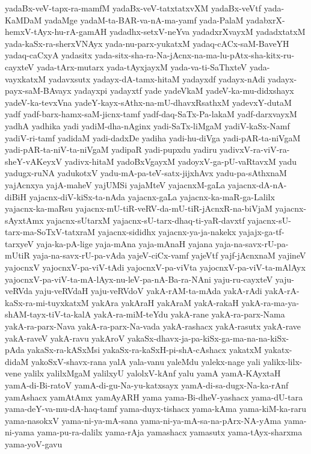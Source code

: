 {yadaBx-veV-tapx-ra-mamfM
yadaBx-veV-tatxtatxvXM
yadaBx-veVtf
yada-KaMDaM
yadaMge
yadaM-ta-BAR-va-nA-ma-yamf
yada-PalaM
yadabxrX-hemxV-tAyx-hu-rA-gamAH
yadadhx-setxV-neYva
yadadxrXvayxM
yadadxtatxM
yada-kaSx-ra-sherxVNAyx
yada-nu-parx-yukatxM
yadaq-cACx-saM-BaveYH
yadaq-caCxyA
yadasitx
yada-sitx-sha-ra-Na-jAcnx-na-ma-lu-pAtx-sha-kitx-ru-cayxteV
yada-tArx-mutarx
yada-tAyxjayxM
yada-va-ti-SaThxteV
yada-vayxkatxM
yadavxsutx
yadayx-dA-tamx-hitaM
yadayxdf
yadayx-nAdi
yadayx-payx-saM-BAvayx
yadayxpi
yadayxtf
yade
yadeVkaM
yadeV-ka-mu-didxshayx
yadeV-ka-tevxVna
yadeY-kayx-sAthx-na-mU-dhavxRsathxM
yadevxY-dutaM
yadf
yadf-barx-hamx-saM-jicnx-tamf
yadf-daq-SaTx-Pa-lakaM
yadf-darxvayxM
yadhA
yadhika
yadi
yadiM-dha-nAginx
yadi-SaTx-liMgaM
yadiV-kaSx-Namf
yadiV-ri-tamf
yadidaM
yadi-dadxDe
yadiha
yadi-hu-diVga
yadi-pAR-ta-niVgaM
yadi-pAR-ta-niV-ta-niVgaM
yadipaR
yadi-pupxdu
yadiru
yadivxV-ra-viV-ra-sheY-vAKeyxV
yadivx-hitaM
yadoBxVgayxM
yadoyxV-ga-pU-vaRtavxM
yadu
yadugx-ruNA
yadukotxV
yadu-mA-pa-teV-satx-jijxhAvx
yadu-pa-sAthxnaM
yajAcnxya
yajA-maheV
yajUMSi
yajaMteV
yajacnxM-gaLa
yajacnx-dA-nA-diBiH
yajacnx-diV-kiSx-ta-nAda
yajacnx-gaLa
yajacnx-ka-maR-ga-Lalilx
yajacnx-ka-maRsu
yajacnx-mU-tiR-veRV-da-mU-tiR-jAcnxR-na-biVjaM
yajacnx-sAyxtAmx
yajacnx-sUtarxM
yajacnx-sU-tarx-dhaq-ti-yaR-davxtf
yajacnx-sU-tarx-ma-SoTxV-tatxraM
yajacnx-sididhx
yajacnx-ya-ja-nakekx
yajajx-ga-tf-tarxyeV
yaja-ka-pA-lige
yaja-mAna
yaja-mAnaH
yajana
yaja-na-savx-rU-pa-mUtiR
yaja-na-savx-rU-pa-vAda
yajeV-ciCx-vamf
yajeVtf
yajf-jAcnxnaM
yajineV
yajocnxV
yajocnxV-pa-viV-tAdi
yajocnxV-pa-viVta
yajocnxV-pa-viV-ta-mAlAyx
yajocnxV-pa-viV-ta-mA-lAyx-nu-leV-pa-nA-Ba-ra-NAni
yaju-ru-cayxteV
yaju-veRVda
yaju-veRVdaH
yaju-veRVdoV
yakA-rAM-ta-mAda
yakA-rAdi
yakA-rA-kaSx-ra-mi-tuyxkatxM
yakAra
yakAraH
yakAraM
yakA-rakaH
yakA-ra-ma-ya-shAM-tayx-tiV-ta-kalA
yakA-ra-miM-teYdu
yakA-rane
yakA-ra-parx-Nama
yakA-ra-parx-Nava
yakA-ra-parx-Na-vada
yakA-rashacx
yakA-rasutx
yakA-rave
yakA-raveV
yakA-ravu
yakAroV
yakaSx-dhavx-ja-pa-kiSx-ga-ma-na-na-kiSx-pAda
yakaSx-ra-kASxMsi
yakaSx-ra-kaSxH-pi-shA-cAshacx
yakatxM
yakatx-didaM
yakoSxV-shavx-rana
yalA
yala-vanu
yaleMdu
yalekx-nage
yali
yalikx-lilx-vene
yalilx
yalilxMgaM
yalilxyU
yalolxV-kAnf
yalu
yamA
yamA-KAyxtaH
yamA-di-Bi-ratoV
yamA-di-gu-Na-yu-katxsayx
yamA-di-sa-dugx-Na-ka-rAnf
yamAshacx
yamAtAmx
yamAyARH
yama
yama-Bi-dheV-yashacx
yama-dU-tara
yama-deY-va-mu-dA-haq-tamf
yama-duyx-tishacx
yama-kAma
yama-kiM-ka-raru
yama-nasokxV
yama-ni-ya-mA-sana
yama-ni-ya-mA-sa-na-pArx-NA-yAma
yama-ni-yama
yama-pu-ra-dalilx
yama-rAja
yamashacx
yamasutx
yama-tAyx-sharxma
yama-yoV-gavu
}
